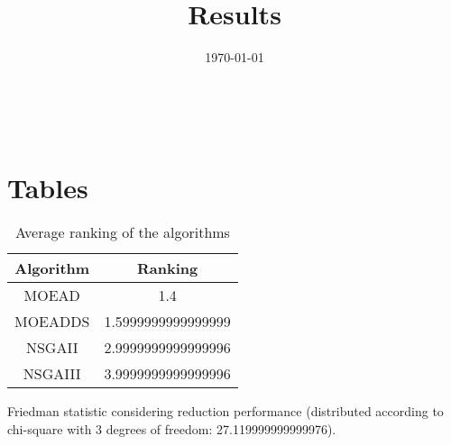 \documentclass{article}
\title{Results}
\author{}
\date{\today}
\begin{document}
\oddsidemargin 0in \topmargin 0in\maketitle
\
\section{Tables}
\begin{table}[!htp]
\centering
\caption{Average ranking of the algorithms}
\begin{tabular}{c|c}
Algorithm&Ranking\\
\hline
MOEAD&1.4\\
MOEADDS&1.5999999999999999\\
NSGAII&2.9999999999999996\\
NSGAIII&3.9999999999999996\\
\end{tabular}
\end{table}


Friedman statistic considering reduction performance (distributed according to chi-square with 3 degrees of freedom: 27.119999999999976).
\end{document}
